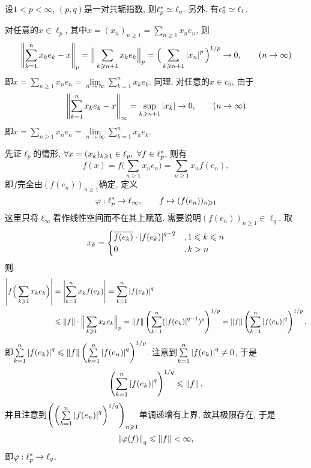 \begin{Proposition}
	设$ 1<p<\infty $, $ (p,q) $是一对共轭指数, 则$ \ell_p^{*}\simeq\ell_q $. 另外, 有$ c_0^{*}\simeq\ell_1 $.
\end{Proposition}
\begin{Proof}
	对任意的$ x\in\ell_p $, 其中$ x=(x_n)_{n\geqslant 1}=\sum\limits_{n\geqslant 1}x_ne_n $, 则
	\[
		\left\| \sum_{k=1}^nx_ke_k-x \right\|_p=\Big\| \sum_{k\geqslant n+1}x_ke_k \Big\|_p=\Big(\sum_{k\geqslant n+1}\left| x_n \right| ^p\Big)^{1/p}\to 0,\qquad(n\to\infty)
	\]
	即$ x=\sum\limits_{n\geqslant 1}x_ne_n=\lim\limits_{n\to\infty}\sum\limits_{k=1}^nx_ke_k $. 同理, 对任意的$ x\in c_0 $, 由于
	\[
		\left\| \sum_{k=1}^nx_ke_k-x \right\|_\infty=\sup_{k\geqslant n+1}\left| x_k \right| \to 0,\qquad(n\to\infty)
	\]
	即$ x=\sum\limits_{n\geqslant 1}x_ne_n=\lim\limits_{n\to\infty}\sum\limits_{k=1}^nx_ke_k $.

	先证$ \ell_p $的情形, $ \forall x=(x_k)_{k\geqslant 1}\in\ell_p,\ \forall f\in\Star{\ell_p} $, 则有
	\[
		f(x)=f\Big( \sum_{n\geqslant 1}x_ne_n \Big)=\sum_{n\geqslant 1}x_nf(e_n),
	\]
	即$ f $完全由$ (f(e_n))_{n\geqslant 1} $确定, 定义
	\[
		\varphi : \ell_p^{*}\to\ell_\infty,\qquad f\mapsto(f(e_n))_{n\geqslant 1}
	\]
	这里只将$ \ell_\infty $看作线性空间而不在其上赋范. 需要说明$ (f(e_n))_{n\geqslant 1}\in\ell_q $. 取
	\[
		x_k=\begin{cases}
			\overline{f(e_k)}\cdot\left| f(e_k) \right| ^{q-2} & ,1\leqslant k\leqslant n \\
			0                                    & , k>n                    \\
		\end{cases}
	\]
	则
	\[
		\begin{aligned}
			\left| f\Big(\sum_{k\geqslant 1}x_ke_k\Big) \right|  & =\left| \sum_{k=1}^nx_kf(e_k) \right| =\sum_{k=1}^n\left| f(e_k) \right| ^q                                                                                                                        \\
			                                           & \leqslant\left\| f \right\|\cdot\Big\| \sum_{k\geqslant 1}x_ke_k \Big\|_p=\left\| f \right\|\left(\sum_{k=1}^n(\left| f(e_k) \right| ^{q-1})^p\right)^{1/p}=\left\| f \right\|\left(\sum_{k=1}^n\left| f(e_k) \right| ^q\right)^{1/p},
		\end{aligned}
	\]
	即$ \sum\limits_{k=1}^n\left| f(e_k) \right| ^q\leqslant\left\| f \right\|\left(\sum\limits_{k=1}^n\left| f(e_n) \right| ^q\right)^{1/p} $. 注意到$ \sum\limits_{k=1}^n\left| f(e_k) \right| ^q\ne 0 $, 于是
	\[
		\left(\sum_{k=1}^n\left| f(e_k) \right| ^q\right)^{1/q}\leqslant\left\| f \right\|,
	\]
	并且注意到$ \left(\left(\sum\limits_{k=1}^n\left| f(e_n) \right| ^q\right)^{1/q}\right)_{n\geqslant 1} $单调递增有上界, 故其极限存在, 于是
	\[
		\left\| \varphi(f) \right\|_q\leqslant\left\| f \right\|<\infty,
	\]
	即$ \varphi : \ell_p^{*}\to\ell_q $.


\end{Proof}
